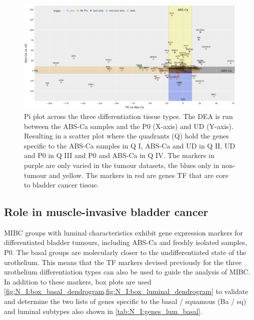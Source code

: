\begin{figure}
    \includegraphics[width=1.0\textwidth,height=1.0\textheight,keepaspectratio]{Sections/Network_I/Resources/selective_pruning/sel_tfs/sel_tfs_pi_all_var_rect.png}
    \caption[The 98 TF and the DEA across the healthy datasets]{Pi plot across the three differentiation tissue types. The DEA is run between the ABS-Ca samples and the P0 (X-axis) and UD (Y-axis). Resulting in a scatter plot where the quadrants (Q) hold the genes specific to the ABS-Ca samples in Q I, ABS-Ca and UD in Q II, UD and P0 in Q III and P0 and ABS-Ca in Q IV. The markers in purple are only varied in the tumour datasets, the blues only in non-tumour and yellow. The markers in red are genes TF that are core to bladder cancer tissue. }
    \label{fig:N_I:pi_sel_tfs_var}
\end{figure}

\newpage


\subsection{Role in muscle-invasive bladder cancer} \label{s:N_I:sel_tfs_cancer}


 MIBC groups with luminal characteristics exhibit gene expression markers for differentiated bladder tumours, including ABS-Ca and freshly isolated samples, P0. The basal groups are molecularly closer to the undifferentiated state of the urothelium. This means that the TF markers devised previously for the three urothelium differentiation types can also be used to guide the analysis of MIBC. In addition to these markers, box plots are used \cref{fig:N_I:box_basal_dendrogram,fig:N_I:box_luminal_dendrogram} to validate and determine the two lists of genes specific to the basal / squamous (Ba / sq) and luminal subtypes also shown in \cref{tab:N_I:genes_lum_basal}. 

